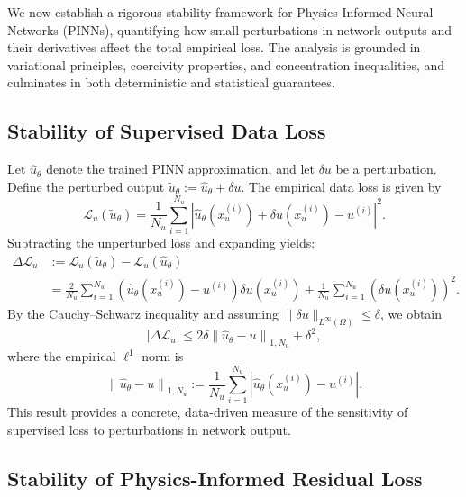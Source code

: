 \documentclass[11pt, a4paper]{article}
\begin{document}
We now establish a rigorous stability framework for Physics-Informed Neural Networks (PINNs), quantifying how small perturbations in network outputs and their derivatives affect the total empirical loss. The analysis is grounded in variational principles, coercivity properties, and concentration inequalities, and culminates in both deterministic and statistical guarantees.

\subsection{Stability of Supervised Data Loss}

Let $\hat{u}_\theta$ denote the trained PINN approximation, and let $\delta u$ be a perturbation. Define the perturbed output $\tilde{u}_\theta := \hat{u}_\theta + \delta u$. The empirical data loss is given by
\[
\mathcal{L}_u(\tilde{u}_\theta) = \frac{1}{N_u} \sum_{i=1}^{N_u} \left| \hat{u}_\theta(x_u^{(i)}) + \delta u(x_u^{(i)}) - u^{(i)} \right|^2.
\]
Subtracting the unperturbed loss and expanding yields:
\begin{align*}
\Delta \mathcal{L}_u &:= \mathcal{L}_u(\tilde{u}_\theta) - \mathcal{L}_u(\hat{u}_\theta) \\
&= \frac{2}{N_u} \sum_{i=1}^{N_u} \left( \hat{u}_\theta(x_u^{(i)}) - u^{(i)} \right) \delta u(x_u^{(i)}) + \frac{1}{N_u} \sum_{i=1}^{N_u} \left( \delta u(x_u^{(i)}) \right)^2.
\end{align*}
By the Cauchy–Schwarz inequality and assuming $\| \delta u \|_{L^\infty(\Omega)} \leq \delta$, we obtain
\[
\left| \Delta \mathcal{L}_u \right| \leq 2\delta \left\| \hat{u}_\theta - u \right\|_{1,N_u} + \delta^2,
\]
where the empirical $\ell^1$ norm is
\[
\left\| \hat{u}_\theta - u \right\|_{1,N_u} := \frac{1}{N_u} \sum_{i=1}^{N_u} \left| \hat{u}_\theta(x_u^{(i)}) - u^{(i)} \right|.
\]
This result provides a concrete, data-driven measure of the sensitivity of supervised loss to perturbations in network output.

\subsection{Stability of Physics-Informed Residual Loss}
\end{document}
